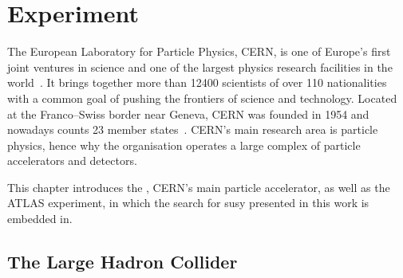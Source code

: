 
\chapter{Experiment} 

\ifpdf
    \graphicspath{{chapter-experiment/Figs/Raster/}{chapter-experiment/Figs/PDF/}{chapter-experiment/Figs/}}
\else
    \graphicspath{{chapter-experiment/Figs/Vector/}{chapter-experiment/Figs/}}
\fi


The European Laboratory for Particle Physics, CERN,  is one of Europe's first joint ventures in science and one of the largest physics research facilities in the world~\cite{About:1997225}. It brings together more than \num[group-separator={,}]{12400} scientists of over 110 nationalities~\cite{CERN:2723123} with a common goal of pushing the frontiers of science and technology.
Located at the Franco--Swiss border near Geneva, CERN was founded in 1954 and nowadays counts 23 member states~\cite{CERN:2723123}. CERN's main research area is particle physics, hence why the organisation operates a large complex of particle accelerators and detectors.

This chapter introduces the , CERN's main particle accelerator, as well as the ATLAS experiment, in which the search for \gls{susy} presented in this work is embedded in.

\section{The Large Hadron Collider}\label{sec:lhc}

